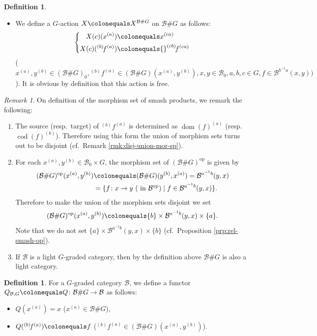 \documentclass{surv-l}
\numberwithin{equation}{chapter}
\numberwithin{figure}{chapter}
\theoremstyle{plain}
\theoremstyle{definition}
\newtheorem{dfn}[thm]{Definition}
\theoremstyle{remark}
\newtheorem{rmk}[thm]{Remark}
\DeclareMathOperator{\dom}{dom}
\DeclareMathOperator{\cod}{cod}
\def\smor(#1,#2,#3){{}^{(#1)}\!#2^{(#3)}}
\begin{document}
\begin{dfn}
\begin{itemize}
\item
We define a $G$-action $X\colonequals  X^{\mathcal{B}\# G}$ on $\mathcal{B}\#G$ as follows:
\begin{equation}\label{eq:G-act-smash}
\left\{
\begin{aligned}
X(c)(x^{(a)}) &\colonequals  x^{(ca)}\\
X(c)(\smor(b,f,a)) &\colonequals  \smor(cb,f,ca)
\end{aligned}
\right.
\end{equation}
($
x^{(a)}, y^{(b)}\!\in\! (\mathcal{B}\# G)_0,
\smor(b,f,a) \!\in\! (\mathcal{B}\# G)(x^{(a)}, y^{(b)}),
x, y \!\in\! \mathcal{B}_0, a, b, c \in G, f \in \mathcal{B}^{b^{-1} a}(x, y))
$).
It is obvious by definition that this action is free.
\end{itemize}
\end{dfn}

\begin{rmk}\label{rmk:smash-rmk}
On definition of the morphism set of smash products,
we remark the following:
\begin{enumerate}
\item
The source (resp.\ target) of $\smor(b,f,a)$ is determined as
$\dom(f)^{(a)}$ (resp.\ $\cod(f)^{(b)}$).
Therefore using this form the union of morphism sets turns out to be disjoint
(cf.\ Remark \ref{rmk:disj-union-mor-sp}).
\item
For each $x^{(a)}, y^{(b)} \in \mathcal{B}_0 \times G$,
the morphism set of $(\mathcal{B} \# G)^{\mathrm{op}}$ is given by
\[
\begin{aligned}
(\mathcal{B} \# G)^{\mathrm{op}}(x^{(a)}, y^{(b)})&\colonequals  (\mathcal{B}\# G)(y^{(b)}, x^{(a)}) = \mathcal{B}^{a^{-1} b}(y, x)\\
&= \{f\colon x \to y \ (\text{ in $\mathcal{B}^{\mathrm{op}}$})\mid f \in \mathcal{B}^{a^{-1} b}(y, x)\}.
\end{aligned}
\]
Therefore to make the union of the morphism sets disjoint
we set
\[
(\mathcal{B} \# G)^{\mathrm{op}}(x^{(a)}, y^{(b)})\colonequals  \{b\} \times \mathcal{B}^{a^{-1} b}(y, x) \times \{a\}.
\]
Note that we do not set $\{a\} \times \mathcal{B}^{a^{-1} b}(y, x) \times \{b\}$
(cf.\ Proposition \ref{prp:rel-smash-op}).
\item
If $\mathcal{B}$ is a light $G$-graded category, then
by the definition above $\mathcal{B} \# G$ is also a light category.
\end{enumerate}
\end{rmk}

\begin{dfn}
For a $G$-graded category $\mathcal{B}$,
we define a functor
$Q_{\mathcal{B},G}\colonequals Q\colon\mathcal{B}\#G\to\mathcal{B}$
as follows:
\begin{itemize}
\item $Q(x^{(a)})=x$ \quad ($x^{(a)}\in\mathcal{B}\#G$),
\item $Q(\smor(b,f,a))\colonequals f$ \quad ($\smor(b,f,a) \in (\mathcal{B}\# G)(x^{(a)},y^{(b)})$).
\end{itemize}
\end{dfn}
\end{document}
